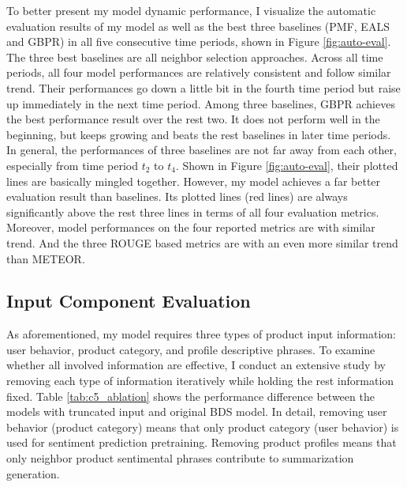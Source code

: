 To better present my model dynamic performance, I visualize the automatic evaluation results of my model as well as  the best three baselines (PMF, EALS and GBPR) in all five consecutive time periods, shown in Figure \ref{fig:auto-eval}. The three best baselines are all neighbor selection approaches. Across all time periods, all four model performances are relatively consistent and follow similar trend. Their performances go down a little bit in the fourth time period but raise up immediately in the next time period. Among three baselines, GBPR achieves the best performance result over the rest two. It does not perform well in the beginning, but keeps growing and beats the rest baselines in later time periods. In general, the performances of three baselines are not far away from each other, especially from time period $t_2$ to $t_4$. Shown in Figure \ref{fig:auto-eval}, their plotted lines are basically mingled together. However, my model achieves a far better evaluation result than baselines. Its plotted lines (red lines) are always significantly above the rest three lines in terms of all four evaluation metrics. Moreover, model performances on the four reported metrics are with similar trend. And the three ROUGE based metrics are with an even more similar trend than METEOR. 




\subsection{Input Component Evaluation}


As aforementioned, my model requires three types of product input information: user behavior, product category, and profile descriptive phrases. To examine whether all involved information are effective, I conduct an extensive study by removing each type of information iteratively while holding the rest information fixed. Table \ref{tab:c5_ablation} shows the performance difference between the models with truncated input and original BDS model. In detail, removing user behavior (product category) means that only product category (user behavior) is used for sentiment prediction pretraining. Removing product profiles means that only neighbor product sentimental phrases contribute to summarization generation. 
 
